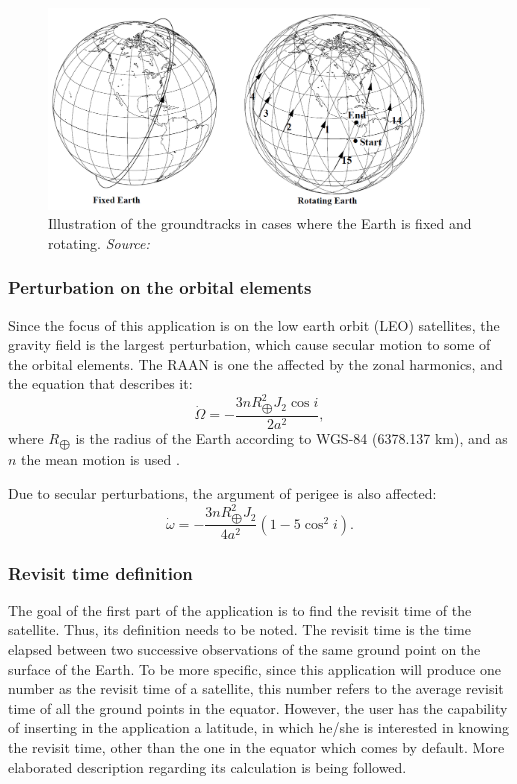 \begin{figure}
\centering
\includegraphics[width=0.9\textwidth]{Images/groundtrack-fixed-rotating.png}\caption{Illustration of the groundtracks in cases where the Earth is fixed and rotating. \textit{Source: \cite{Vallado}}}
\label{groundtrack-fixed-rotating} 
\end{figure}

\bigskip
\subsubsection{Perturbation on the orbital elements}
\bigskip

Since the focus of this application is on the low earth orbit (LEO) satellites, the gravity field is the largest perturbation, which cause secular motion to some of the orbital elements. The RAAN is one the affected by the zonal harmonics, and the equation that describes it:
\begin{equation}
\dot{\Omega} = - \frac{3 n R_{\bigoplus}^{2} J_{2} \cos{i}}{2 a^{2}},
\end{equation}
where $R_{\bigoplus}$ is the radius of the Earth according to WGS-84 (6378.137 km), and as $n$ the mean motion is used \cite{Montenbruck}.

Due to secular perturbations, the argument of perigee is also affected:
\begin{equation}
\dot{\omega} = - \frac{3 n R_{\bigoplus}^{2} J_{2}}{4 a^{2}} (1 - 5 \cos^{2}{i}).
\end{equation}


\bigskip
\subsubsection{Revisit time definition}
\bigskip

The goal of the first part of the application is to find the revisit time of the satellite. Thus, its definition needs to be noted. The revisit time is the time elapsed between two successive observations of the same ground point on the surface of the Earth. \cite{Luo} To be more specific, since this application will produce one number as the revisit time of a satellite, this number refers to the average revisit time of all the ground points in the equator. However, the user has the capability of inserting in the application a latitude, in which he/she is interested in knowing the revisit time, other than the one in the equator which comes by default. More elaborated description regarding its calculation is being followed.

